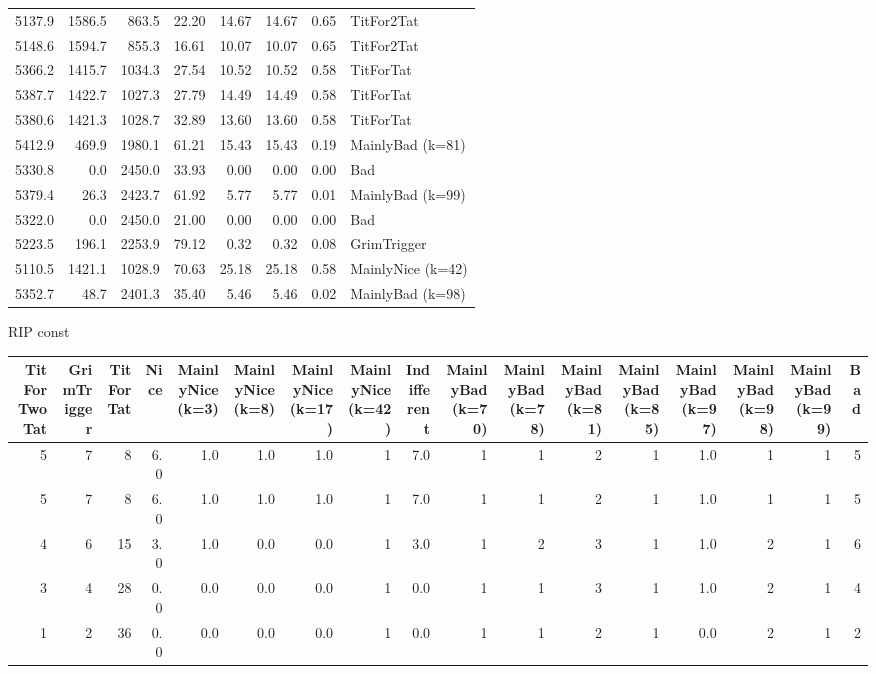 \documentclass[journal,a4paper,10pt,twoside]{IEEEtran} %
\begin{document}
\begin{tabular}{rrrrrrrl}
    5137.9 &  1586.5 &   863.5 &  22.20 &  14.67 &  14.67 &  0.65 &         TitFor2Tat \\
    5148.6 &  1594.7 &   855.3 &  16.61 &  10.07 &  10.07 &  0.65 &         TitFor2Tat \\
    5366.2 &  1415.7 &  1034.3 &  27.54 &  10.52 &  10.52 &  0.58 &          TitForTat \\
    5387.7 &  1422.7 &  1027.3 &  27.79 &  14.49 &  14.49 &  0.58 &          TitForTat \\
    5380.6 &  1421.3 &  1028.7 &  32.89 &  13.60 &  13.60 &  0.58 &          TitForTat \\
    5412.9 &   469.9 &  1980.1 &  61.21 &  15.43 &  15.43 &  0.19 &   MainlyBad (k=81) \\
    5330.8 &     0.0 &  2450.0 &  33.93 &   0.00 &   0.00 &  0.00 &                Bad \\
    5379.4 &    26.3 &  2423.7 &  61.92 &   5.77 &   5.77 &  0.01 &   MainlyBad (k=99) \\
    5322.0 &     0.0 &  2450.0 &  21.00 &   0.00 &   0.00 &  0.00 &                Bad \\
    5223.5 &   196.1 &  2253.9 &  79.12 &   0.32 &   0.32 &  0.08 &        GrimTrigger \\
    5110.5 &  1421.1 &  1028.9 &  70.63 &  25.18 &  25.18 &  0.58 &  MainlyNice (k=42) \\
    5352.7 &    48.7 &  2401.3 &  35.40 &   5.46 &   5.46 &  0.02 &   MainlyBad (k=98) \\ \bottomrule
\end{tabular}

RIP const
\begin{tabular}{rrrrrrrrrrrrrrrrr} \toprule
    TitForTwoTat &  GrimTrigger &  TitForTat &  Nice &  MainlyNice (k=3) &  MainlyNice (k=8) &  MainlyNice (k=17) &  MainlyNice (k=42) &  Indifferent &  MainlyBad (k=70) &  MainlyBad (k=78) &  MainlyBad (k=81) &  MainlyBad (k=85) &  MainlyBad (k=97) &  MainlyBad (k=98) &  MainlyBad (k=99) &  Bad \\ \midrule
    5 &  7 &   8 &  6.0 &  1.0 &  1.0 &  1.0 &  1 &  7.0 &  1 &  1 &  2 &  1 &  1.0 &  1 &  1 &  5 \\
    5 &  7 &   8 &  6.0 &  1.0 &  1.0 &  1.0 &  1 &  7.0 &  1 &  1 &  2 &  1 &  1.0 &  1 &  1 &  5 \\
    4 &  6 &  15 &  3.0 &  1.0 &  0.0 &  0.0 &  1 &  3.0 &  1 &  2 &  3 &  1 &  1.0 &  2 &  1 &  6 \\
    3 &  4 &  28 &  0.0 &  0.0 &  0.0 &  0.0 &  1 &  0.0 &  1 &  1 &  3 &  1 &  1.0 &  2 &  1 &  4 \\
    1 &  2 &  36 &  0.0 &  0.0 &  0.0 &  0.0 &  1 &  0.0 &  1 &  1 &  2 &  1 &  0.0 &  2 &  1 &  2 \\ \bottomrule
\end{tabular}
\end{document}
